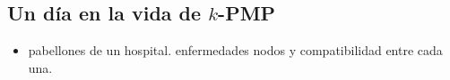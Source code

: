 \subsection{Un día en la vida de $k$-PMP}

\begin{itemize}
  \item pabellones de un hospital. enfermedades nodos y compatibilidad entre cada una.
\end{itemize}
